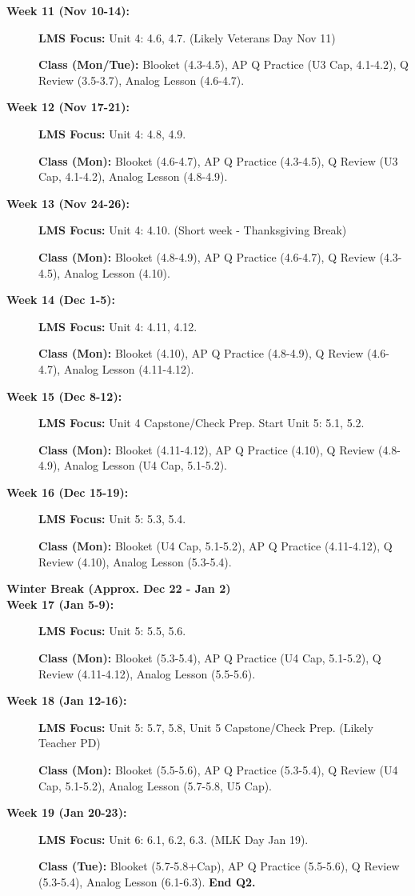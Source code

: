 \documentclass[11pt]{article}
\begin{document}
\begin{description}
  \item[\textbf{Week 11 (Nov 10-14):}] \textbf{LMS Focus:} Unit 4: 4.6, 4.7. (Likely Veterans Day Nov 11)
  
  \textbf{Class (Mon/Tue):} Blooket (4.3-4.5), AP Q Practice (U3 Cap, 4.1-4.2), Q Review (3.5-3.7), Analog Lesson (4.6-4.7).
  
  \item[\textbf{Week 12 (Nov 17-21):}] \textbf{LMS Focus:} Unit 4: 4.8, 4.9.
  
  \textbf{Class (Mon):} Blooket (4.6-4.7), AP Q Practice (4.3-4.5), Q Review (U3 Cap, 4.1-4.2), Analog Lesson (4.8-4.9).
  
  \item[\textbf{Week 13 (Nov 24-26):}] \textbf{LMS Focus:} Unit 4: 4.10. (Short week - Thanksgiving Break)
  
  \textbf{Class (Mon):} Blooket (4.8-4.9), AP Q Practice (4.6-4.7), Q Review (4.3-4.5), Analog Lesson (4.10).
  
  \item[\textbf{Week 14 (Dec 1-5):}] \textbf{LMS Focus:} Unit 4: 4.11, 4.12.
  
  \textbf{Class (Mon):} Blooket (4.10), AP Q Practice (4.8-4.9), Q Review (4.6-4.7), Analog Lesson (4.11-4.12).
  
  \item[\textbf{Week 15 (Dec 8-12):}] \textbf{LMS Focus:} Unit 4 Capstone/Check Prep. Start Unit 5: 5.1, 5.2.
  
  \textbf{Class (Mon):} Blooket (4.11-4.12), AP Q Practice (4.10), Q Review (4.8-4.9), Analog Lesson (U4 Cap, 5.1-5.2).
  
  \item[\textbf{Week 16 (Dec 15-19):}] \textbf{LMS Focus:} Unit 5: 5.3, 5.4.
  
  \textbf{Class (Mon):} Blooket (U4 Cap, 5.1-5.2), AP Q Practice (4.11-4.12), Q Review (4.10), Analog Lesson (5.3-5.4).
  
  \item[\textbf{Winter Break (Approx. Dec 22 - Jan 2)}]
  
  \item[\textbf{Week 17 (Jan 5-9):}] \textbf{LMS Focus:} Unit 5: 5.5, 5.6.
  
  \textbf{Class (Mon):} Blooket (5.3-5.4), AP Q Practice (U4 Cap, 5.1-5.2), Q Review (4.11-4.12), Analog Lesson (5.5-5.6).
  
  \item[\textbf{Week 18 (Jan 12-16):}] \textbf{LMS Focus:} Unit 5: 5.7, 5.8, Unit 5 Capstone/Check Prep. (Likely Teacher PD)
  
  \textbf{Class (Mon):} Blooket (5.5-5.6), AP Q Practice (5.3-5.4), Q Review (U4 Cap, 5.1-5.2), Analog Lesson (5.7-5.8, U5 Cap).
  
  \item[\textbf{Week 19 (Jan 20-23):}] \textbf{LMS Focus:} Unit 6: 6.1, 6.2, 6.3. (MLK Day Jan 19).
  
  \textbf{Class (Tue):} Blooket (5.7-5.8+Cap), AP Q Practice (5.5-5.6), Q Review (5.3-5.4), Analog Lesson (6.1-6.3). \textbf{End Q2.}
\end{description}
\end{document}
